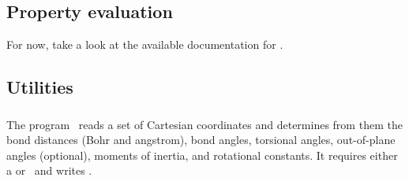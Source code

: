 \subsection{Property evaluation}
For now, take a look at the available documentation for \PSIoeprop .

\subsection{Utilities}
\subsubsection{\PSIgeom}
The program \PSIgeom\ reads a set of Cartesian coordinates
and determines from them the bond distances (Bohr and
angstrom), bond angles, torsional angles, out-of-plane
angles (optional), moments of inertia, and rotational constants.
It requires either a  or \geomdat\ and writes \geomout. 
